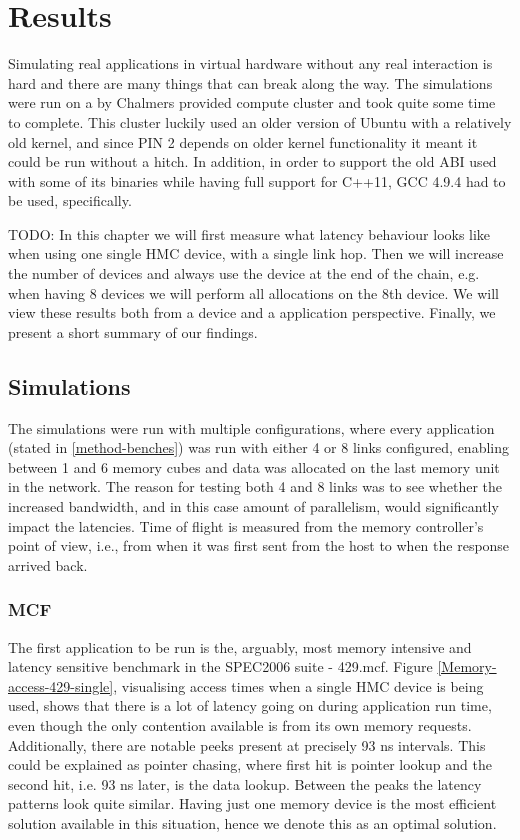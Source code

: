 \chapter{Results}
Simulating real applications in virtual hardware without any real interaction is hard and there are many things that can break along the way. The simulations were run on a by Chalmers provided compute cluster and took quite some time to complete. This cluster luckily used an older version of Ubuntu with a relatively old kernel, and since PIN 2 depends on older kernel functionality it meant it could be run without a hitch. In addition, in order to support the old ABI used with some of its binaries while having full support for C++11, GCC 4.9.4 had to be used, specifically. 
\bigskip

TODO: In this chapter we will first measure what latency behaviour looks like when using one single HMC device, with a single link hop. Then we will increase the number of devices and always use the device at the end of the chain, e.g. when having 8 devices we will perform all allocations on the 8th device. We will view these results both from a device and a application perspective. Finally, we present a short summary of our findings.

\section{Simulations}
The simulations were run with multiple configurations, where every application (stated in \ref{method-benches}) was run with either 4 or 8 links configured, enabling between 1 and 6 memory cubes and data was allocated on the last memory unit in the network. The reason for testing both 4 and 8 links was to see whether the increased bandwidth, and in this case amount of parallelism, would significantly impact the latencies. Time of flight is measured from the memory controller's point of view, i.e., from when it was first sent from the host to when the response arrived back. 
\bigskip

\subsection{MCF}
The first application to be run is the, arguably, most memory intensive and latency sensitive benchmark in the SPEC2006 suite - 429.mcf. Figure \ref{Memory-access-429-single}, visualising access times when a single HMC device is being used, shows that there is a lot of latency going on during application run time, even though the only contention available is from its own memory requests. Additionally, there are notable peeks present at precisely 93 ns intervals. This could be explained as pointer chasing, where first hit is pointer lookup and the second hit, i.e. 93 ns later, is the data lookup. Between the peaks the latency patterns look quite similar. Having just one memory device is the most efficient solution available in this situation, hence we denote this as an optimal solution.
\bigskip

